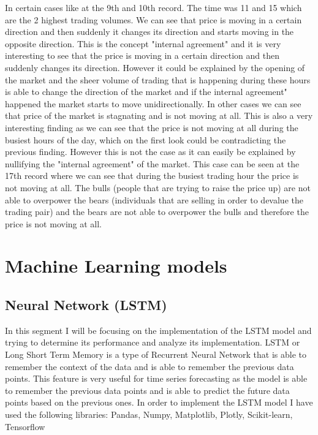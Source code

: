\documentclass{imc-inf}
\begin{document}
	In certain cases like at the 9th and 10th record. The time was 11 and 15 which are the 2 highest trading volumes. We can see that price is moving in a certain direction and then suddenly it changes its direction and starts moving in the opposite direction.
	This is the concept "internal agreement" and it is very interesting to see that the price is moving in a certain direction and then suddenly changes its direction. However it could be 
	explained by the opening of the market and the sheer volume of trading that is happening during these hours is able to change the direction of the market and if the internal agreement" happened
	the market starts to move unidirectionally.
	In other cases we can
	see that price of the market is stagnating and is not moving at all. This is also a very interesting finding as we can see that the price is not moving at all during the busiest hours of the day, which 
	on the first look could be contradicting the previous finding. However this is not the case as it can easily be explained by nullifying the "internal agreement" of the market.
	This case can be seen at the 17th record where we can see that during the busiest trading hour the price is not moving at all.
	The bulls (people that are trying to raise the price up) are not able to overpower the bears (individuals that are selling in order to devalue the trading pair) and the bears are not able to overpower the bulls and therefore the price is not moving at all. 
	
	
	\section{Machine Learning models}
	\subsection{Neural Network (LSTM)} 
	In this segment I will be focusing on the implementation of the LSTM \cite{lstm_implement} model and trying to determine its performance and analyze its implementation.
	LSTM or Long Short Term Memory is a type of Recurrent Neural Network that is able to remember the context of the data and is able to remember the previous data points.
	This feature is very useful for time series forecasting as the model is able to remember the previous data points and is able to predict the future data points based on the previous ones.
	In order to implement the LSTM model I have used the following libraries: Pandas, Numpy, Matplotlib, Plotly, Scikit-learn, Tensorflow
	
\end{document}
